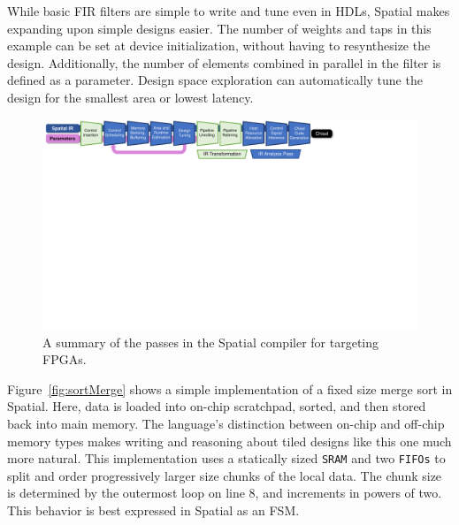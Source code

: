 While basic FIR filters are simple to write and tune even in HDLs, Spatial makes expanding upon simple designs easier. The number of weights and taps in this example can be set at device initialization, without having to resynthesize the design. Additionally, the number of elements combined in parallel in the filter is defined as a parameter. Design space exploration can automatically tune the design for the smallest area or lowest latency.


\begin{figure}
\centering
\includegraphics[clip, trim=0.3cm 15.4cm 7.7cm 0.0cm, width=\linewidth]{figs/compiler_flow.pdf}
\caption{A summary of the passes in the Spatial compiler for targeting FPGAs.}
\label{fig:compilerflow}
\end{figure}


Figure~\ref{fig:sortMerge} shows a simple implementation of a fixed size merge sort in Spatial. Here, data is loaded into on-chip scratchpad, sorted, and then stored back into main memory.
The language's distinction between on-chip and off-chip memory types makes writing and reasoning about tiled designs like this one much more natural.
This implementation uses a statically sized \texttt{\small{SRAM}} and two \texttt{\small{FIFOs}} to split and order progressively larger size chunks of the local data.
The chunk size is determined by the outermost loop on line 8, and increments in powers of two. This behavior is best expressed in Spatial as an FSM.
